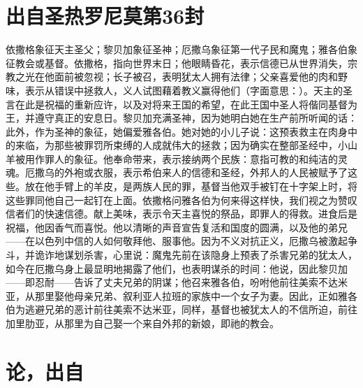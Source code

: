 
\section{出自圣热罗尼莫第36封}

依撒格象征天主圣父；黎贝加象征圣神；厄撒乌象征第一代子民和魔鬼；雅各伯象征教会或基督。依撒格，指向世界末日；他眼睛昏花，表示信德已从世界消失，宗教之光在他面前被忽视；长子被召，表明犹太人拥有法律；父亲喜爱他的肉和野味，表示从错误中拯救人，义人试图藉着教义赢得他们（字面意思：）。天主的圣言在此是祝福的重新应许，以及对将来王国的希望，在此王国中圣人将偕同基督为王，并遵守真正的安息日。黎贝加充满圣神，因为她明白她在生产前所听闻的话：此外，作为圣神的象征，她偏爱雅各伯。她对她的小儿子说：这预表救主在肉身中的来临，为那些被罪罚所束缚的人成就伟大的拯救；因为确实在整部圣经中，小山羊被用作罪人的象征。他奉命带来，表示接纳两个民族：意指可教的和纯洁的灵魂。厄撒乌的外袍或衣服，表示希伯来人的信德和圣经，外邦人的人民被赋予了这些。放在他手臂上的羊皮，是两族人民的罪，基督当他双手被钉在十字架上时，将这些罪同他自己一起钉在上面。依撒格问雅各伯为何来得这样快，我们视之为赞叹信者们的快速信德。献上美味，表示令天主喜悦的祭品，即罪人的得救。进食后是祝福，他因香气而喜悦。他以清晰的声音宣告复活和国度的圆满，以及他的弟兄——在以色列中信的人如何敬拜他、服事他。因为不义对抗正义，厄撒乌被激起争斗，并诡诈地谋划杀害，心里说：魔鬼先前在该隐身上预表了杀害兄弟的犹太人，如今在厄撒乌身上最显明地揭露了他们，也表明谋杀的时间：他说，因此黎贝加——即忍耐——告诉了丈夫兄弟的阴谋；他召来雅各伯，吩咐他前往美索不达米亚，从那里娶他母亲兄弟、叙利亚人拉班的家族中一个女子为妻。因此，正如雅各伯为逃避兄弟的恶计前往美索不达米亚，同样，基督也被犹太人的不信所迫，前往加里肋亚，从那里为自己娶一个来自外邦的新娘，即祂的教会。\par


\section{论，出自}

